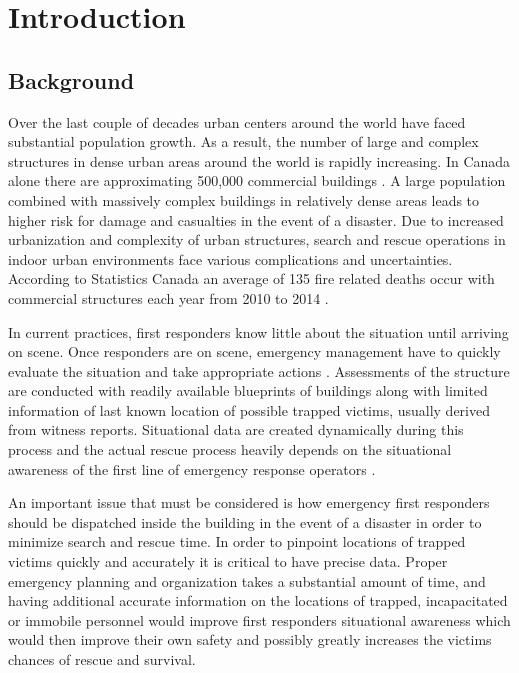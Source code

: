 

\setcounter{section}{0}
\section{Introduction}
\bigskip

\subsection{Background}
Over the last couple of decades urban centers around the world have faced substantial population growth. As a result, the number of large and complex structures in dense urban areas around the world is rapidly increasing. In Canada alone there are approximating 500,000 commercial buildings \cite{R1}. A large population combined with massively complex buildings in relatively dense areas leads to higher risk for damage and casualties in the event of a disaster. Due to increased urbanization and complexity of urban structures, search and rescue operations in indoor urban environments face various complications and uncertainties. According to Statistics Canada an average of 135 fire related deaths occur with commercial structures each year from 2010 to 2014 \cite{R2}.

\medskip
In current practices, first responders know little about the situation until arriving on scene. Once responders are on scene, emergency management have to quickly evaluate the situation and take appropriate actions \cite{R3}.  Assessments of the structure are conducted with readily available blueprints of buildings along with limited information of last known location of possible trapped victims, usually derived from witness reports. Situational data are created dynamically during this process and the actual rescue process heavily depends on the situational awareness of the first line of emergency response operators \cite{R4}.

\medskip
An important issue that must be considered is how emergency first responders should be dispatched inside the building in the event of a disaster in order to minimize search and rescue time. In order to pinpoint locations of trapped victims quickly and accurately it is critical to have precise data. Proper emergency planning and organization takes a substantial amount of time, and having additional accurate information on the locations of trapped, incapacitated or immobile personnel would improve first responders situational awareness which would then improve their own safety and possibly greatly increases the victims chances of rescue and survival.

